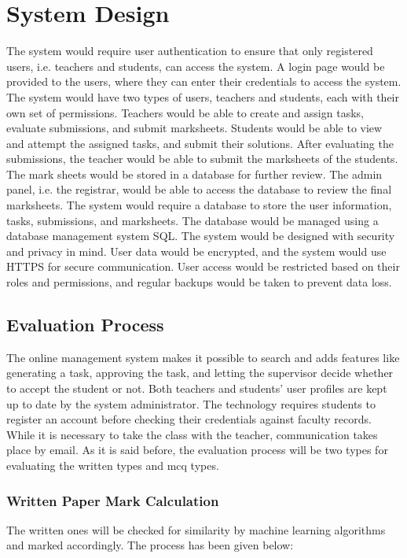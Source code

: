 \section{System Design}
The system would require user authentication to ensure that only registered users, i.e. teachers and students, can access the system. A login page would be provided to the users, where they can enter their credentials to access the system. The system would have two types of users, teachers and students, each with their own set of permissions. Teachers would be able to create and assign tasks, evaluate submissions, and submit marksheets. Students would be able to view and attempt the assigned tasks, and submit their solutions. After evaluating the submissions, the teacher would be able to submit the marksheets of the students. The mark sheets would be stored in a database for further review. The admin panel, i.e. the registrar, would be able to access the database to review the final marksheets. The system would require a database to store the user information, tasks, submissions, and marksheets. The database would be managed using a database management system SQL. The system would be designed with security and privacy in mind. User data would be encrypted, and the system would use HTTPS for secure communication. User access would be restricted based on their roles and permissions, and regular backups would be taken to prevent data loss.

\subsection{Evaluation Process}
The online management system makes it possible to search and adds features like generating a task, approving the task, and letting the supervisor decide whether to accept the student or not. Both teachers and students' user profiles are kept up to date by the system administrator. The technology requires students to register an account before checking their credentials against faculty records. While it is necessary to take the class with the teacher, communication takes place by email. As it is said before, the evaluation process will be two types for evaluating the written types and mcq types.

\newpage
\subsubsection{Written Paper Mark Calculation}
The written ones will be checked for similarity by machine learning algorithms and marked accordingly. The process has been given below:\\

